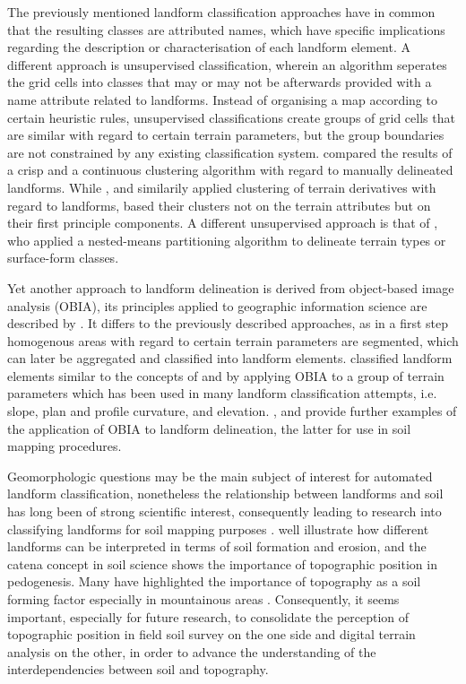 \documentclass[preprint,12pt,authoryear]{elsarticle}
\begin{document}
The previously mentioned landform classification approaches have in common that the resulting classes  are attributed names, which have specific implications regarding the description or characterisation of each landform element. A different approach is unsupervised classification, wherein an algorithm seperates the grid cells into classes that may or may not be afterwards provided with a name attribute related to landforms. Instead of organising a map according to certain heuristic rules, unsupervised classifications create groups of grid cells that are similar with regard to certain terrain parameters, but the group boundaries are not constrained by any existing classification system. \cite{Irvin1997} compared the results of a crisp and a continuous clustering algorithm with regard to manually delineated landforms.  While \cite{Adediran2004}, \cite{Arrell2007} and \cite{Burrough2000a}  similarily applied clustering of terrain derivatives with regard to landforms, \cite{Moravej2012} based their clusters not on the terrain attributes but on their first principle components. A different unsupervised approach is that of  \cite{Iwahashi2007}, who applied a nested-means partitioning algorithm to delineate terrain types or surface-form classes.

Yet another approach to landform delineation is derived from object-based image analysis (OBIA), its principles applied to geographic information science are described by \cite{Blaschke2014}. It differs to the previously described approaches, as in a first step homogenous areas with regard to certain terrain parameters are segmented, which can later be aggregated and classified into landform elements. \cite{Dragut2006} classified landform elements similar to the concepts of \cite{Dikau1988} and \cite{Pennock1987} by applying OBIA  to a group of terrain parameters which has been used in many landform classification attempts, i.e. slope, plan and profile curvature, and  elevation. \cite{Gercek2011}, \cite{Mashimbye2014} and \cite{Kringer2009}  provide further examples of the application of OBIA to landform delineation, the latter for use in soil mapping procedures.

Geomorphologic questions may be the main subject of interest for automated landform classification, nonetheless the relationship between landforms and soil has long been of strong scientific interest, consequently leading to research into classifying landforms for soil mapping purposes \citep{Schmidt2004,Herbst2012,Hughes2009, Barringer2008}. \cite{MacMillan2000a} well illustrate how different landforms can be interpreted in terms of soil formation and erosion, and the catena concept in soil science \citep{Schaetzl2013} shows the importance of topographic position in pedogenesis. Many have highlighted the importance of topography as a soil forming factor especially in mountainous areas \citep{Geitner2011,Herbst2012}. Consequently, it seems important, especially for future research, to consolidate the perception of topographic position in field soil survey on the one side and digital terrain analysis on the other, in order to advance the understanding of the interdependencies between soil and topography.
\end{document}
